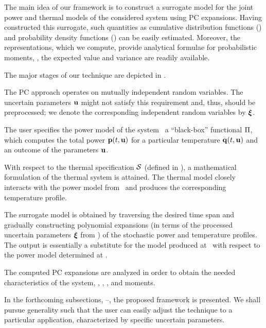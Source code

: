 The main idea of our framework is to construct a surrogate model for the joint power and thermal models of the considered system using PC expansions.
Having constructed this surrogate, such quantities as cumulative distribution functions (\cdfs) and probability density functions (\pdfs) can be easily estimated.
Moreover, the representations, which we compute, provide analytical formulae for probabilistic moments, \ie, the expected value and variance are readily available.

The major stages of our technique are depicted in .

The PC approach operates on mutually independent random variables. The uncertain parameters $\mathbf{u}$ might not satisfy this requirement and, thus, should be preprocessed; we denote the corresponding independent random variables by $\boldsymbol{\xi}$.

The user specifies the power model of the system \via\ a ``black-box'' functional $\oPower$, which computes the total power $\mathbf{p}(t, \mathbf{u})$ for a particular temperature $\mathbf{q}(t, \mathbf{u})$ and an outcome of the parameters $\mathbf{u}$.

With respect to the thermal specification $\mathcal{S}$ (defined in ), a mathematical formulation of the thermal system is attained.
The thermal model closely interacts with the power model from \ and produces the corresponding temperature profile.

The surrogate model is obtained by traversing the desired time span and gradually constructing polynomial expansions (in terms of the processed uncertain parameters $\boldsymbol{\xi}$ from ) of the stochastic power and temperature profiles.
The output is essentially a substitute for the model produced at \ with respect to the power model determined at .

The computed PC expansions are analyzed in order to obtain the needed characteristics of the system, \eg, \cdfs, \pdfs, and moments.

In the forthcoming subsections, --, the proposed framework is presented.
We shall pursue generality such that the user can easily adjust the technique to a particular application, characterized by specific uncertain parameters.

